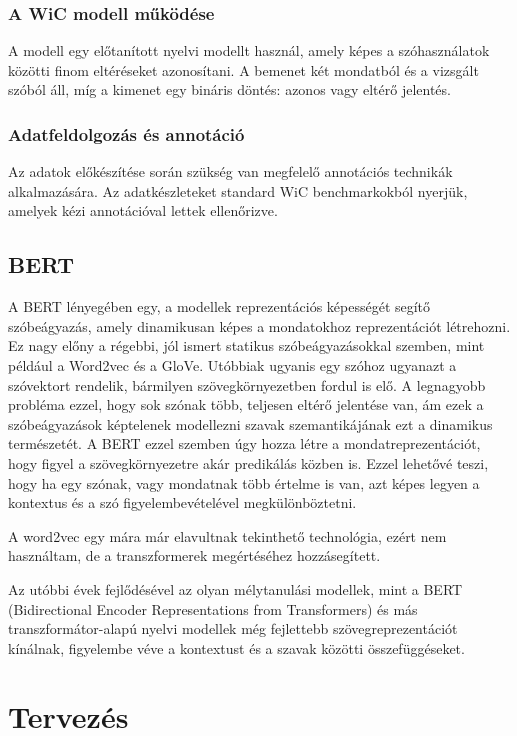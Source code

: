 \documentclass[12pt]{report}
\theoremstyle{definition}
\begin{document}
\subsubsection{A WiC modell működése}
A modell egy előtanított nyelvi modellt használ, amely képes a szóhasználatok közötti finom eltéréseket azonosítani. A bemenet két mondatból és a vizsgált szóból áll, míg a kimenet egy bináris döntés: azonos vagy eltérő jelentés.

\subsubsection{Adatfeldolgozás és annotáció}
Az adatok előkészítése során szükség van megfelelő annotációs technikák alkalmazására. Az adatkészleteket standard WiC benchmarkokból nyerjük, amelyek kézi annotációval lettek ellenőrizve.

\subsection{BERT}
A BERT lényegében egy, a modellek reprezentációs képességét segítő szóbeágyazás, amely dinamikusan képes a mondatokhoz reprezentációt létrehozni. Ez nagy előny a régebbi, jól ismert statikus szóbeágyazásokkal szemben, mint például a Word2vec és a GloVe. Utóbbiak ugyanis egy szóhoz ugyanazt a szóvektort rendelik, bármilyen szövegkörnyezetben fordul is elő. A legnagyobb probléma ezzel, hogy sok szónak több, teljesen eltérő jelentése van, ám ezek a szóbeágyazások képtelenek modellezni szavak szemantikájának ezt a dinamikus természetét. A BERT ezzel szemben úgy hozza létre a mondatreprezentációt, hogy figyel a szövegkörnyezetre akár predikálás közben is. Ezzel lehetővé teszi, hogy ha egy szónak, vagy mondatnak több értelme is van, azt képes legyen a kontextus és a szó figyelembevételével megkülönböztetni.


A word2vec egy mára már elavultnak tekinthető technológia, ezért nem használtam, de a transzformerek megértéséhez hozzásegített.


Az utóbbi évek fejlődésével az olyan mélytanulási modellek, mint a BERT (Bidirectional Encoder Representations from Transformers) és más transzformátor-alapú nyelvi modellek még fejlettebb szövegreprezentációt kínálnak, figyelembe véve a kontextust és a szavak közötti összefüggéseket.






\section{Tervezés}
\end{document}
